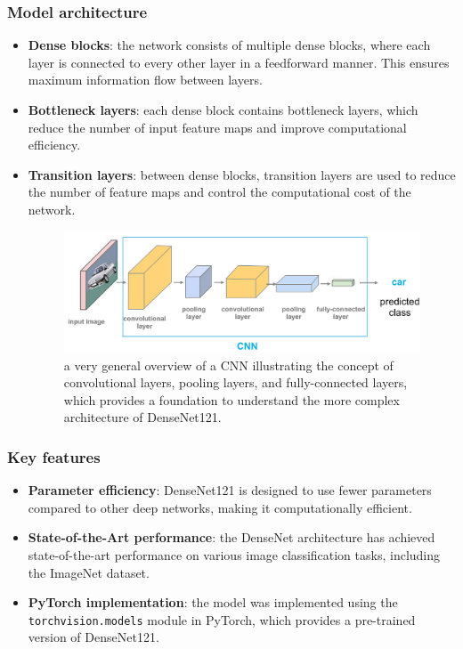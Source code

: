 \documentclass{article}
\begin{document}
\subsubsection{Model architecture}
\begin{itemize}
    \item \textbf{Dense blocks}: the network consists of multiple dense blocks, where each layer is connected to every other layer in a feedforward manner. This ensures maximum information flow between layers.
    \item \textbf{Bottleneck layers}: each dense block contains bottleneck layers, which reduce the number of input feature maps and improve computational efficiency.
    \item \textbf{Transition layers}: between dense blocks, transition layers are used to reduce the number of feature maps and control the computational cost of the network.
    \begin{figure}[h!]
        \centering
            \includegraphics[width=\textwidth]{DenseNet121.png}
            \caption{a very general overview of a CNN illustrating the concept of convolutional layers, pooling layers, and fully-connected layers, which provides a foundation to understand the more complex architecture of DenseNet121.}
            \label{fig:cpu_time}
    \end{figure}
\end{itemize}



\subsubsection{Key features}
\begin{itemize}
    \item \textbf{Parameter efficiency}: DenseNet121 is designed to use fewer parameters compared to other deep networks, making it computationally efficient.
    \item \textbf{State-of-the-Art performance}: the DenseNet architecture has achieved state-of-the-art performance on various image classification tasks, including the ImageNet dataset.
    \item \textbf{PyTorch implementation}: the model was implemented using the \\ 
    \texttt{torchvision.models} module in PyTorch, which provides a pre-trained version of DenseNet121.
\end{itemize}
\end{document}

